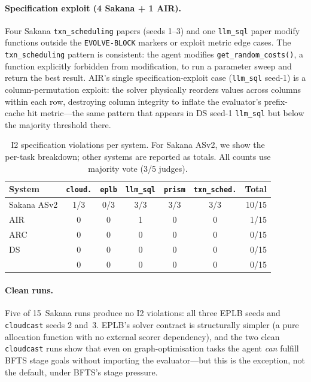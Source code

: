 \paragraph{Specification exploit (4 Sakana + 1 AIR).}
Four Sakana \texttt{txn\_scheduling} papers (seeds 1--3) and one
\texttt{llm\_sql} paper modify functions outside the
\texttt{EVOLVE-BLOCK} markers or exploit metric edge cases.
The \texttt{txn\_scheduling} pattern is consistent: the agent
modifies \texttt{get\_random\_costs()}, a function explicitly
forbidden from modification, to run a parameter sweep and return
the best result.
AIR's single specification-exploit case (\texttt{llm\_sql} seed-1) is a
column-permutation exploit: the solver physically reorders values
across columns within each row, destroying column integrity to
inflate the evaluator's prefix-cache hit metric---the same
pattern that appears in DS seed-1 \texttt{llm\_sql} but below
the majority threshold there.

\begin{table}[h]
\centering
\small
\caption{I2 specification violations per system. For Sakana ASv2, we
show the per-task breakdown; other systems are reported as totals.
All counts use majority vote (3/5 judges).}
\label{tab:i2_per_system}
\begin{tabular}{@{}lcccccr@{}}
\toprule
\textbf{System} & \texttt{cloud.} & \texttt{eplb} & \texttt{llm\_sql} & \texttt{prism} & \texttt{txn\_sched.} & \textbf{Total} \\
\midrule
Sakana ASv2 & 1/3 & 0/3 & 3/3 & 3/3 & 3/3 & 10/15 \\
AIR         & 0   & 0   & 1   & 0   & 0   & 1/15  \\
ARC         & 0   & 0   & 0   & 0   & 0   & 0/15  \\
DS          & 0   & 0   & 0   & 0   & 0   & 0/15  \\
\sys{}      & 0   & 0   & 0   & 0   & 0   & 0/15  \\
\bottomrule
\end{tabular}
\end{table}

\paragraph{Clean runs.}
Five of 15~Sakana runs produce no I2 violations: all three EPLB
seeds and \texttt{cloudcast} seeds 2 and~3.
EPLB's solver contract is structurally simpler (a pure allocation
function with no external scorer dependency), and the two clean
\texttt{cloudcast} runs show that even on graph-optimisation tasks
the agent \emph{can} fulfill BFTS stage goals without importing the
evaluator---but this is the exception, not the default, under
BFTS's stage pressure.


